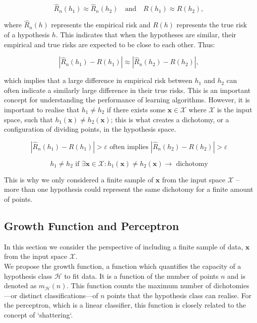 \begin{equation*}
    \widehat{R}_n(h_1) \approx \widehat{R}_n(h_2) \quad \text{and} \quad R(h_1) \approx R(h_2),
\end{equation*}

where \( \widehat{R}_n(h) \) represents the empirical risk and \( R(h) \) represents the true risk of a hypothesis \( h \). This indicates that when the hypotheses are similar, their empirical and true risks are expected to be close to each other. Thus:

\begin{equation*}
    |\widehat{R}_n(h_1) - R(h_1)| \approx |\widehat{R}_n(h_2) - R(h_2)|,
\end{equation*}

which implies that a large difference in empirical risk between \( h_1 \) and \( h_2 \) can often indicate a similarly large difference in their true risks. This is an important concept for understanding the performance of learning algorithms. However, it is important to realise that \( h_1 \neq h_2 \) if there exists some \( \textbf{x} \in \mathcal{X} \) where $\mathcal{X}$ is the input space, such that \( h_1(\textbf{x}) \neq h_2(\textbf{x}) \); this is what creates a dichotomy, or a configuration of dividing points, in the hypothesis space.

\[
\left|\widehat{R}_n(h_1) - R(h_1)\right| > \varepsilon \text{ often implies } \left|\widehat{R}_n(h_2) - R(h_2)\right| > \varepsilon
\]

\[
h_1 \neq h_2 \text{ if } \exists \textbf{x} \in \mathcal{X} : h_1(\textbf{x}) \neq h_2(\textbf{x}) \rightarrow \text{ dichotomy}
\]

This is why we only considered a finite sample of $\textbf{x}$ from the input space $\mathcal{X}$ – more than one hypothesis could represent the same dichotomy for a finite amount of points.  


\subsection{Growth Function and Perceptron}

In this section we consider the perspective of including a finite sample of data, $\textbf{x}$ from the input space $\mathcal{X}$.\\

We propose the growth function, a function which quantifies the capacity of a hypothesis class \( \mathcal{H} \) to fit data. It is a function of the number of points \( n \) and is denoted as \( m_{\mathcal{H}}(n) \). This function counts the maximum number of dichotomies—or distinct classifications—of \( n \) points that the hypothesis class can realise. For the perceptron, which is a linear classifier, this function is closely related to the concept of `shattering`.

